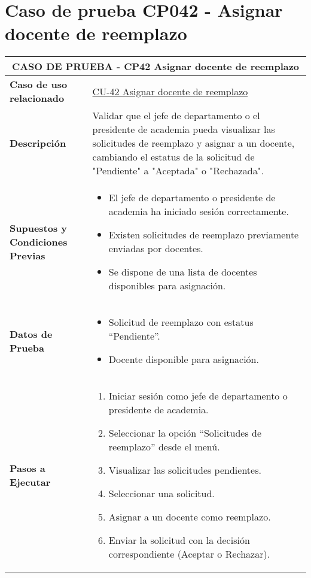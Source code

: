 \section{Caso de prueba CP042 - Asignar docente de reemplazo}

\begin{longtable}{|p{5cm}|p{10cm}|}
	\hline
	\multicolumn{2}{|c|}{\textbf{CASO DE PRUEBA - CP42 Asignar docente de reemplazo}} \\
	\hline
	\textbf{Caso de uso relacionado} & \hyperref[CU-42]{CU-42 Asignar docente de reemplazo} \\
	\hline
	\textbf{Descripción} & Validar que el jefe de departamento o el presidente de academia pueda visualizar las solicitudes de reemplazo y asignar a un docente, cambiando el estatus de la solicitud de "Pendiente" a "Aceptada" o "Rechazada". \\
	\hline
	\textbf{Supuestos y Condiciones Previas} & 
	\begin{itemize}
		\item El jefe de departamento o presidente de academia ha iniciado sesión correctamente.
		\item Existen solicitudes de reemplazo previamente enviadas por docentes.
		\item Se dispone de una lista de docentes disponibles para asignación.
	\end{itemize} \\
	\hline
	\textbf{Datos de Prueba} & 
	\begin{itemize}
		\item Solicitud de reemplazo con estatus “Pendiente”.
		\item Docente disponible para asignación.
	\end{itemize} \\
	\hline
	\textbf{Pasos a Ejecutar} & 
	\begin{enumerate}
		\item Iniciar sesión como jefe de departamento o presidente de academia.
		\item Seleccionar la opción “Solicitudes de reemplazo” desde el menú.
		\item Visualizar las solicitudes pendientes.
		\item Seleccionar una solicitud.
		\item Asignar a un docente como reemplazo.
		\item Enviar la solicitud con la decisión correspondiente (Aceptar o Rechazar).
	\end{enumerate} \\

\end{longtable}
